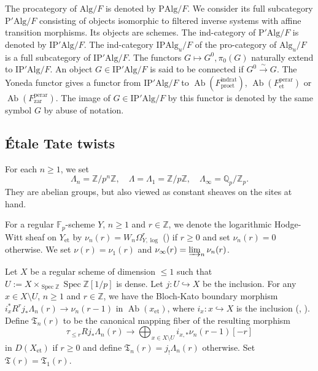 \documentclass{amsart}
\theoremstyle{remark}
\numberwithin{equation}{subsection}
\newcommand{\into}{\hookrightarrow}
\newcommand{\isomto}{\overset{\sim}{\to}}
\newcommand{\Z}{\mathbb{Z}}
\newcommand{\Q}{\mathbb{Q}}
\newcommand{\F}{\mathbb{F}}
\newcommand{\et}{\mathrm{et}}
\newcommand{\zar}{\mathrm{zar}}
\newcommand{\dirlim}{\varinjlim}
\newcommand{\rat}{\mathrm{rat}}
\newcommand{\ind}{\mathrm{ind}}
\newcommand{\pro}{\mathrm{pro}}
\newcommand{\perar}{\mathrm{perar}}
\newcommand{\Alg}{\mathrm{Alg}}
\newcommand{\Ind}{\mathrm{I}}
\newcommand{\Pro}{\mathrm{P}}
\DeclareMathOperator{\Spec}{Spec}
\DeclareMathOperator{\Ab}{Ab}
\begin{document}
The procategory of $\Alg / F$ is denoted by $\Pro \Alg / F$.
We consider its full subcategory $\Pro' \Alg / F$ consisting of objects isomorphic to
filtered inverse systems with affine transition morphisms.
Its objects are schemes.
The ind-category of $\Pro' \Alg / F$ is denoted by $\Ind \Pro' \Alg / F$.
The ind-category $\Ind \Pro \Alg_{u} / F$ of the pro-category of $\Alg_{u} / F$
is a full subcategory of $\Ind \Pro' \Alg / F$.
The functors $G \mapsto G^{0}, \pi_{0}(G)$ naturally extend to $\Ind \Pro' \Alg / F$.
An object $G \in \Ind \Pro' \Alg / F$ is said to be connected
if $G^{0} \isomto G$.
The Yoneda functor gives a functor from $\Ind \Pro' \Alg / F$
to $\Ab(F^{\ind\rat}_{\pro\et})$, $\Ab(F^{\perar}_{\et})$ or $\Ab(F^{\perar}_{\zar})$.
The image of $G \in \Ind \Pro' \Alg / F$ by this functor is denoted by the same symbol $G$
by abuse of notation.


\subsection{\'Etale Tate twists}

For each $n \ge 1$, we set
	\[
			\Lambda_{n}
		=
			\Z / p^{n} \Z,
		\quad
			\Lambda
		=
			\Lambda_{1}
		=
			\Z / p \Z,
		\quad
			\Lambda_{\infty}
		=
			\Q_{p} / \Z_{p}.
	\]
They are abelian groups, but also viewed as constant sheaves on the sites at hand.

For a regular $\F_{p}$-scheme $Y$, $n \ge 1$ and $r \in \Z$,
we denote the logarithmic Hodge-Witt sheaf on $Y_{\et}$ by
$\nu_{n}(r) = W_{n} \Omega_{Y, \log}^{r}$
(\cite[Definition 2.6]{Shi07}) if $r \ge 0$
and set $\nu_{n}(r) = 0$ otherwise.
We set $\nu(r) = \nu_{1}(r)$ and $\nu_{\infty}(r) = \dirlim_{n} \nu_{n}(r)$.

Let $X$ be a regular scheme of dimension $\le 1$ such that
$U := X \times_{\Spec \Z} \Spec \Z[1 / p]$ is dense.
Let $j \colon U \into X$ be the inclusion.
For any $x \in X \setminus U$, $n \ge 1$ and $r \in \Z$,
we have the Bloch-Kato boundary morphism
$i_{x}^{\ast} R^{r} j_{\ast} \Lambda_{n}(r) \to \nu_{n}(r - 1)$
in $\Ab(x_{\et})$,
where $i_{x} \colon x \into X$ is the inclusion
(\cite[(1.3) (ii)]{Kat86Hasse}, \cite[Theorem (1.4) (i)]{BK86}).
Define $\mathfrak{T}_{n}(r)$ to be the canonical mapping fiber of the resulting morphism
	\begin{equation} \label{0000}
				\tau_{\le r}
				R j_{\ast} \Lambda_{n}(r)
			\to
				\bigoplus_{x \in X \setminus U}
					i_{x, \ast} \nu_{n}(r - 1)[-r]
	\end{equation}
in $D(X_{\et})$ if $r \ge 0$
and define $\mathfrak{T}_{n}(r) = j_{!} \Lambda_{n}(r)$ otherwise.
Set $\mathfrak{T}(r) = \mathfrak{T}_{1}(r)$.
\end{document}
